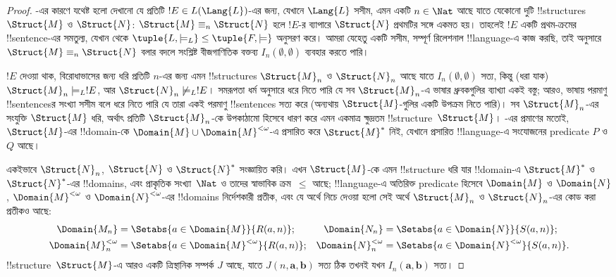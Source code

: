 \documentclass[../../../include/open-logic-section]{subfiles}
\begin{document}
\begin{proof}
-এর কারণে যথেষ্ট হলো দেখানো যে প্রতিটি
$!E \in L(\Lang{L})$-এর জন্য, যেখানে $\Lang{L}$ সসীম, এমন একটি
$n \in \Nat$ আছে যাতে যেকোনো দুটি !!{structure}s $\Struct{M}$ ও
$\Struct{N}$: $\Struct{M} \equiv_n \Struct{N}$ হলে $!E$-র ব্যাপারে
$\Struct{N}$ প্রথমটির সঙ্গে একমত হয়। তাহলেই $!E$ একটি প্রথম-ক্রমের !!{sentence}-এর সমতুল্য,
যেখান থেকে $\tuple{L, \models_L} \le \tuple{F, \models}$ অনুসরণ করে।
আমরা যেহেতু একটি সসীম, সম্পূর্ণ রিলেশনাল !!{language}-এ কাজ করছি,
তাই  অনুসারে
$\Struct{M} \equiv_n \Struct{N}$ বলার বদলে সংশ্লিষ্ট বীজগাণিতিক
বক্তব্য $I_n(\emptyset,\emptyset)$ ব্যবহার করতে পারি।

$!E$ দেওয়া থাক, বিরোধাভাসের জন্য ধরি প্রতিটি $n$-এর জন্য এমন
!!{structure}s $\Struct{M}_n$ ও $\Struct{N}_n$ আছে যাতে
$I_n(\emptyset, \emptyset)$ সত্য, কিন্তু (ধরা যাক)
$\Struct{M}_n \models_L !E$, আর $\Struct{N}_n \not\models_L !E$।
সমরূপতা ধর্ম অনুসারে ধরে নিতে পারি যে সব $\Struct{M}_n$-এ ভাষার
ধ্রুবকগুলির ব্যাখ্যা একই বস্তু; আরও, ভাষায় পরমাণু !!{sentence}sর
সংখ্যা সসীম বলে ধরে নিতে পারি যে তারা একই পরমাণু !!{sentence}s সত্য
করে (অন্যথায় $\Struct{M}$-গুলির একটি উপক্রম নিতে পারি)। সব
$\Struct{M}_n$-এর সংযুক্তি $\Struct{M}$ ধরি, অর্থাৎ প্রতিটি
$\Struct{M}_n$-কে উপকাঠামো হিসেবে ধারণ করে এমন একমাত্র ক্ষুদ্রতম
!!{structure}~$\Struct{M}$। -এর প্রমাণের মতোই,
$\Struct{M}$-এর !!{domain}-কে $\Domain{M} \cup \Domain{M}^{<\omega}$-এ প্রসারিত
করে $\Struct{M}^*$ নিই, যেখানে প্রসারিত !!{language}-এ সংযোজনের
predicate $P$ ও~$Q$ আছে।

একইভাবে $\Struct{N}_n$, $\Struct{N}$ ও $\Struct{N}^*$ সংজ্ঞায়িত করি।
এখন $\Struct{M}$-কে এমন !!{structure} ধরি যার !!{domain}-এ
$\Struct{M}^*$ ও $\Struct{N}^*$-এর !!{domain}s, এবং প্রাকৃতিক
সংখ্যা~$\Nat$ ও তাদের স্বাভাবিক ক্রম~$\le$ আছে; !!{language}-এ অতিরিক্ত
predicate হিসেবে $\Domain{M}$ ও $\Domain{N}$,
$\Domain{M}^{<\omega}$ ও $\Domain{N}^{<\omega}$-এর !!{domain}s নির্দেশকারী প্রতীক, এবং
যে অর্থে নিচে দেওয়া হলো সেই অর্থে $\Struct{M}_n$ ও
$\Struct{N}_n$-এর কোড করা প্রতীকও আছে:
\begin{align*}
  \Domain{M_n} & = \Setabs{a \in \Domain{M}}{R(a, n)}; & 
  \Domain{N_n} & = \Setabs{a \in \Domain{N}}{S(a,n)}; \\
  \Domain{M}^{<\omega}_n & = \Setabs{a \in \Domain{M}^{<\omega}}{R(a,n)}; &
  \Domain{N}^{<\omega}_n & = \Setabs{a \in \Domain{N}^{<\omega}}{S(a,n)}. 
\end{align*}
!!{structure}~$\Struct{M}$-এ আরও একটি ত্রিস্থানিক সম্পর্ক $J$ আছে,
যাতে $J(n, \mathbf{a}, \mathbf{b})$ সত্য ঠিক তখনই যখন
$I_n(\mathbf{a}, \mathbf{b})$ সত্য।


\end{proof}
\end{document}
